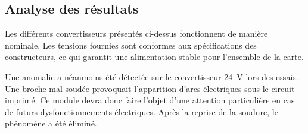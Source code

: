 \begin{table}[H]
    \centering
    \caption{Mesures sur le convertisseur 0.5~V (U5)}
    \label{tab:conv_0_5v}
\end{table}

\subsection{Analyse des résultats}
Les différents convertisseurs présentés ci-dessus fonctionnent de manière nominale. Les tensions fournies sont conformes aux spécifications des constructeurs, ce qui garantit une alimentation stable pour l'ensemble de la carte.

Une anomalie a néanmoins été détectée sur le convertisseur 24~V lors des essais. Une broche mal soudée provoquait l'apparition d'arcs électriques sous le circuit imprimé. Ce module devra donc faire l'objet d'une attention particulière en cas de futurs dysfonctionnements électriques. Après la reprise de la soudure, le phénomène a été éliminé.

